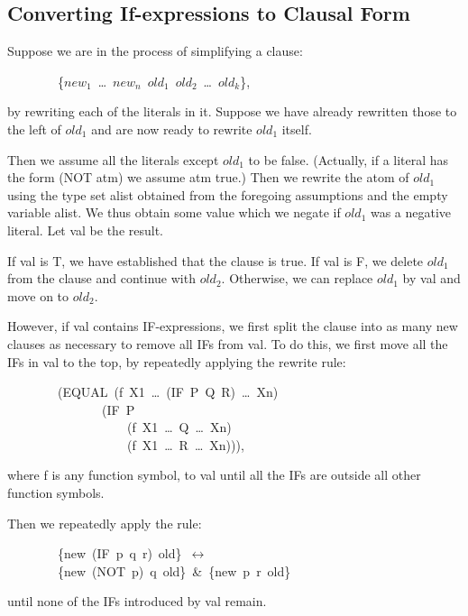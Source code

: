 \documentclass[10pt]{book}
\newenvironment{pubasis}{\begin{flushleft}}{\end{flushleft}}
\begin{document}
\subsection{Converting If-expressions to Clausal Form}
Suppose we are in the process of simplifying a clause:

\begin{pubasis}
~~~~~~~~\{$new_{1}$~\ldots{}~$new_{n}$~$old_{1}$~$old_{2}$~\ldots{}~$old_{k}$\},\\
\end{pubasis}
by rewriting each of the literals in it.  Suppose we have already
rewritten those to the left of $old_{1}$ and are now ready to rewrite
$old_{1}$ itself.

Then we  assume all the literals except $old_{1}$ to be false.  (Actually,
if a literal has the form (NOT atm) we assume atm true.)
Then we rewrite the atom of $old_{1}$ using the type set
alist obtained from the foregoing assumptions and the empty
variable alist.  We thus obtain some
value which we negate if $old_{1}$ was a negative literal.  Let val be the result.

If val is T, we have established that the clause is true.
If val is F, we delete $old_{1}$ from the clause and continue with
$old_{2}$.
Otherwise, we can replace $old_{1}$ by val and move on
to $old_{2}$.

However, if val contains IF-expressions, we first
split the clause into as many new clauses as necessary to remove all
IFs from val.  To do this, we
first move all the IFs in val to the top, by repeatedly
applying the rewrite rule:

\begin{pubasis}
~~~~~~~~(EQUAL~(f~X1~\ldots{}~(IF~P~Q~R)~\ldots{}~Xn)\\
~~~~~~~~~~~~~~~(IF~P\\
~~~~~~~~~~~~~~~~~~~(f~X1~\ldots{}~Q~\ldots{}~Xn)\\
~~~~~~~~~~~~~~~~~~~(f~X1~\ldots{}~R~\ldots{}~Xn))),\\
\end{pubasis}
where f is any function symbol,
to val until all the IFs are outside all other
function symbols.

Then we repeatedly apply the rule:
\begin{pubasis}
~~~~~~~~\{new~(IF~p~q~r)~old\}~$\leftrightarrow$\\
~~~~~~~~\{new~(NOT~p)~q~old\}~\&~\{new~p~r~old\}\\
\end{pubasis}
until none of the IFs introduced by val remain.
\end{document}
